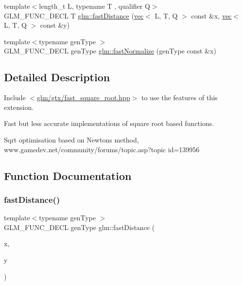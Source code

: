 \begin{DoxyCompactItemize}
\item 
{\footnotesize template$<$length\+\_\+t L, typename T , qualifier Q$>$ }\\G\+L\+M\+\_\+\+F\+U\+N\+C\+\_\+\+D\+E\+CL T \hyperlink{group__gtx__fast__square__root_ga42d3e771fa7cb3c60d828e315829df19}{glm\+::fast\+Distance} (\hyperlink{structglm_1_1vec}{vec}$<$ L, T, Q $>$ const \&x, \hyperlink{structglm_1_1vec}{vec}$<$ L, T, Q $>$ const \&y)
\item 
{\footnotesize template$<$typename gen\+Type $>$ }\\G\+L\+M\+\_\+\+F\+U\+N\+C\+\_\+\+D\+E\+CL gen\+Type \hyperlink{group__gtx__fast__square__root_ga3b02c1d6e0c754144e2f1e110bf9f16c}{glm\+::fast\+Normalize} (gen\+Type const \&x)
\end{DoxyCompactItemize}


\subsection{Detailed Description}
Include $<$\hyperlink{fast__square__root_8hpp}{glm/gtx/fast\+\_\+square\+\_\+root.\+hpp}$>$ to use the features of this extension.

Fast but less accurate implementations of square root based functions.
\begin{DoxyItemize}
\item Sqrt optimisation based on Newton\textquotesingle{}s method, www.\+gamedev.\+net/community/forums/topic.asp?topic id=139956 
\end{DoxyItemize}

\subsection{Function Documentation}
\mbox{\label{group__gtx__fast__square__root_gaac333418d0c4e0cc6d3d219ed606c238}} 
\subsubsection{\texorpdfstring{fast\+Distance()}{fastDistance()}\hspace{0.1cm}{\footnotesize\ttfamily [1/2]}}
{\footnotesize\ttfamily template$<$typename gen\+Type $>$ \\
G\+L\+M\+\_\+\+F\+U\+N\+C\+\_\+\+D\+E\+CL gen\+Type glm\+::fast\+Distance (\begin{DoxyParamCaption}\item[{gen\+Type}]{x,  }\item[{gen\+Type}]{y }\end{DoxyParamCaption})}



